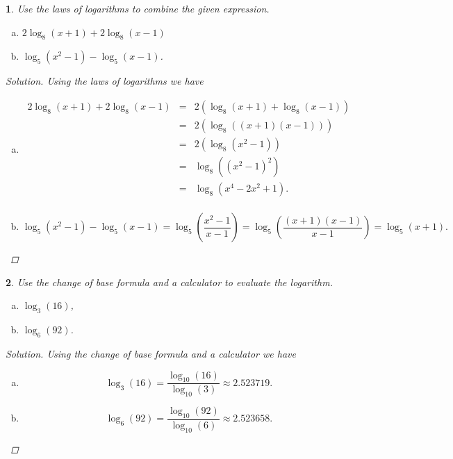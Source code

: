 \documentclass[12pt]{amsart}
\newtheorem{thm}{}
\begin{document}
\setcounter{thm}{21} 
\begin{thm}
  Use the laws of logarithms to combine the given expression.
  \begin{enumerate}[(a)]
  \item
    $2\log_8(x+1) + 2\log_8(x - 1)$    
  \item
    $\log_5(x^2 -1) - \log_5(x - 1)$.
  \end{enumerate}

  \begin{proof}[Solution]
    Using the laws of logarithms we have
    \begin{enumerate}[(a)]
    \item
      \begin{eqnarray*}
        2\log_8(x+1) + 2\log_8(x - 1) &=& 2(\log_8(x+1) + \log_8(x - 1))\\
        &=& 2(\log_8((x+1)(x - 1)))\\
        &=& 2(\log_8(x^2 - 1))\\
        &=& \log_8((x^2 - 1)^2)\\
        &=& \log_8(x^4 - 2x^2 + 1).\\
      \end{eqnarray*}
    \item
      $$\log_5(x^2 -1) - \log_5(x - 1) = \log_5\left(\frac{x^2 - 1}{x - 1}\right) = \log_5\left(\frac{(x + 1)(x - 1)}{x - 1}\right) = \log_5(x + 1).$$
    \end{enumerate}
  \end{proof}
\end{thm}

\setcounter{thm}{33} 
\begin{thm}
  Use the change of base formula and a calculator to evaluate the logarithm.
  \begin{enumerate}[(a)]
  \item
    $\log_3(16)$,
  \item
    $\log_6(92)$.
  \end{enumerate}
  \begin{proof}[Solution]
    Using the change of base formula and a calculator we have
    \begin{enumerate}[(a)]
    \item
      $$\log_3(16) = \frac{\log_{10}(16)}{\log_{10}(3)} \approx 2.523719.$$
    \item
      $$\log_6(92) = \frac{\log_{10}(92)}{\log_{10}(6)} \approx 2.523658.$$
    \end{enumerate}
  \end{proof}
\end{thm}
\end{document}
